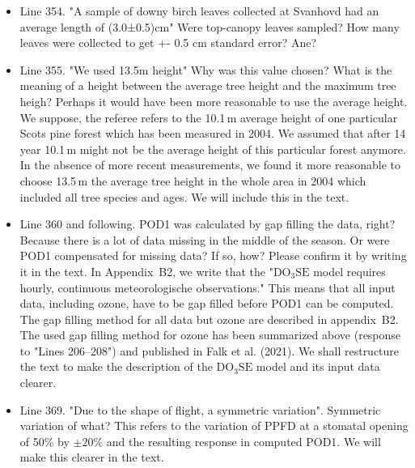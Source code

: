 \documentclass{scrartcl}
\begin{document}
\begin{itemize}
\item {\color{blue}Line 354. "A sample of downy birch leaves collected at Svanhovd had an average length of (3.0±0.5)cm" Were top-canopy leaves sampled? How many leaves were collected to get +- 0.5 cm standard error?}
Ane?

\item {\color{blue}Line 355. "We used 13.5m height"
Why was this value chosen? What is the meaning of a height between the average tree
height and the maximum tree heigh? Perhaps it would have been more reasonable to use
the average height.}
We suppose, the referee refers to the 10.1\,m average height of one particular Scots pine forest which has been measured in 2004. We assumed that after 14 year 10.1\,m might not be the average height of this particular forest anymore. In the absence of more recent measurements, we found it more reasonable to choose 13.5\,m the average tree height in the whole area in 2004 which included all tree species and ages.
We will include this in the text.

\item {\color{blue}Line 360 and following. POD1 was calculated by gap filling the data, right? Because there is a lot of data missing in the middle of the season. Or were POD1 compensated for missing data? If so, how? Please confirm it by writing it in the text.}
In Appendix~B2, we write that the "$\mathrm{DO_3SE}$ model requires hourly, continuous meteorologische observations." This means that all input data, including ozone, have to be gap filled before POD1 can be computed. The gap filling method for all data but ozone are described in appendix~B2. The used gap filling method for ozone has been summarized above (response to "Lines 206--208") and published in Falk et al. (2021). We shall restructure the text to make the description of the $\mathrm{DO_3SE}$ model and its input data clearer.

\item {\color{blue}Line 369. "Due to the shape of flight, a symmetric variation".
Symmetric variation of what?}
This refers to the variation of PPFD at a stomatal opening of 50\% by $\pm 20\%$ and the resulting response in computed POD1. We will make this clearer in the text.


\end{itemize}
\end{document}
